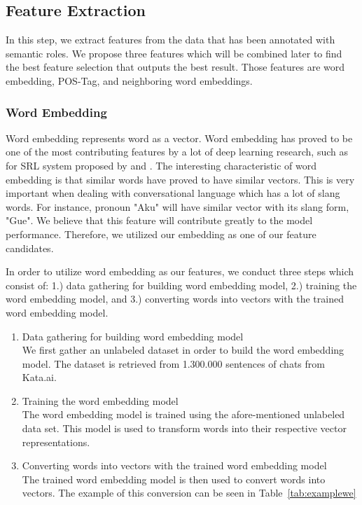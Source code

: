\subsection{Feature Extraction}
In this step, we extract features from the data that has been annotated with semantic roles. We propose three features which will be combined later to find the best feature selection that outputs the best result. Those features are word embedding, POS-Tag, and neighboring word embeddings.

\subsubsection{Word Embedding}
Word embedding represents word as a vector. Word embedding has proved to be one of the most contributing features by a lot of deep learning research, such as for SRL system proposed by \cite{zhou2015end} and \cite{collobert2011natural}. The interesting characteristic of word embedding is that similar words have proved to have similar vectors. This is very important when dealing with conversational language which has a lot of slang words. For instance, pronoun "Aku" will have similar vector with its slang form, "Gue". We believe that this feature will contribute greatly to the model performance. Therefore, we utilized our embedding as one of our feature candidates.

In order to utilize word embedding as our features, we conduct three steps which consist of: 1.) data gathering for building word embedding model, 2.) training the word embedding model, and 3.) converting words into vectors with the trained word embedding model.

\begin{enumerate}
	\item Data gathering for building word embedding model\\
	We first gather an unlabeled dataset in order to build the word embedding model. The dataset is retrieved from 1.300.000 sentences of chats from Kata.ai.
	
	\item Training the word embedding model\\
	The word embedding model is trained using the afore-mentioned unlabeled data set. This model is used to transform words into their respective vector representations.
	
	\item Converting words into vectors with the trained word embedding model\\
	The trained word embedding model is then used to convert words into vectors. The example of this conversion can be seen in Table~\ref{tab:examplewe}
\end{enumerate}

